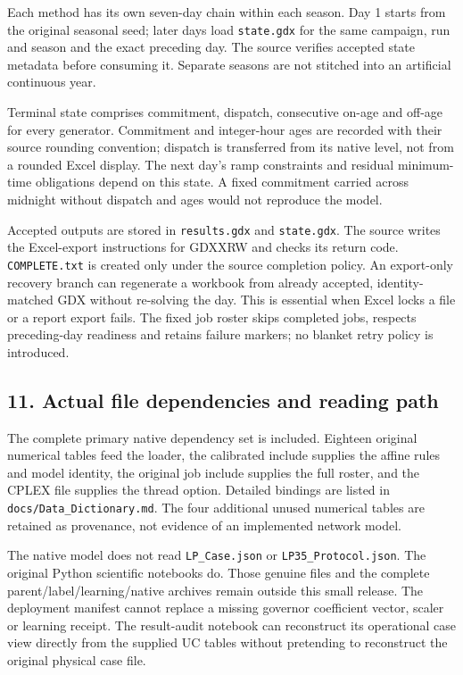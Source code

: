 \documentclass[
  11pt,
  a4paper,
]{article}
\begin{document}
Each method has its own seven-day chain within each season. Day 1 starts
from the original seasonal seed; later days load \texttt{state.gdx} for
the same campaign, run and season and the exact preceding day. The
source verifies accepted state metadata before consuming it. Separate
seasons are not stitched into an artificial continuous year.

Terminal state comprises commitment, dispatch, consecutive on-age and
off-age for every generator. Commitment and integer-hour ages are
recorded with their source rounding convention; dispatch is transferred
from its native level, not from a rounded Excel display. The next day's
ramp constraints and residual minimum-time obligations depend on this
state. A fixed commitment carried across midnight without dispatch and
ages would not reproduce the model.

Accepted outputs are stored in \texttt{results.gdx} and
\texttt{state.gdx}. The source writes the Excel-export instructions for
GDXXRW and checks its return code. \texttt{COMPLETE.txt} is created only
under the source completion policy. An export-only recovery branch can
regenerate a workbook from already accepted, identity-matched GDX
without re-solving the day. This is essential when Excel locks a file or
a report export fails. The fixed job roster skips completed jobs,
respects preceding-day readiness and retains failure markers; no blanket
retry policy is introduced.

\subsection{11. Actual file dependencies and reading
path}\label{actual-file-dependencies-and-reading-path}

The complete primary native dependency set is included. Eighteen
original numerical tables feed the loader, the calibrated include
supplies the affine rules and model identity, the original job include
supplies the full roster, and the CPLEX file supplies the thread option.
Detailed bindings are listed in \texttt{docs/Data\_Dictionary.md}. The
four additional unused numerical tables are retained as provenance, not
evidence of an implemented network model.

The native model does not read \texttt{LP\_Case.json} or
\texttt{LP35\_Protocol.json}. The original Python scientific notebooks
do. Those genuine files and the complete parent/label/learning/native
archives remain outside this small release. The deployment manifest
cannot replace a missing governor coefficient vector, scaler or learning
receipt. The result-audit notebook can reconstruct its operational case
view directly from the supplied UC tables without pretending to
reconstruct the original physical case file.
\end{document}
